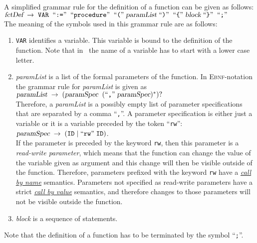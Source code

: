 \noindent
A simplified grammar rule for the definition of a function can be given as follows:
\\[0.2cm]
\hspace*{1.3cm}
$\textsl{fctDef} \;\rightarrow\; \mathtt{VAR}\; \;\mbox{``\texttt{:=}''}\; \;\mbox{``\texttt{procedure}''}\; \;\mbox{``\texttt{(}''}\; \textsl{paramList} 
 \;\mbox{``\texttt{)}''}\; \;\mbox{``\texttt{\{}''}\; \textsl{block} \;\mbox{``\texttt{\}}''}\; \;\mbox{``\texttt{;}''}\;$
\\[0.2cm]
The meaning of the symbols used in this grammar rule are as follows:
\begin{enumerate}
\item \texttt{VAR} identifies a variable.  This variable is bound to the definition of the function.
      Note that in \setlx\ the name of a variable has to start with a lower case letter.
\item \textsl{paramList} is a list of the formal parameters of the function.  In
      \textsc{Ebnf}-notation the grammar rule for \textsl{paramList} is given as
      \\[0.2cm]
      \hspace*{1.3cm}
      $\textsl{paramList} \;\rightarrow\; (\textsl{paramSpec}\;\; (\mbox{``\texttt{,}''}\; \textsl{paramSpec})^*)?$
      \\[0.2cm]
      Therefore, a \textsl{paramList} is a possibly empty list of parameter specifications that are 
      separated by a comma ``\texttt{,}''.  A parameter specification is either just a variable
      or it is a variable preceded by the token ``\texttt{rw}'':
      \\[0.2cm]
      \hspace*{1.3cm}
      $\textsl{paramSpec} \;\rightarrow\; (\mathtt{ID} \mid \mbox{``\texttt{rw}''}\; \mathtt{ID})$.
      \\[0.2cm]  
      If the parameter is preceded by the keyword \texttt{rw}, then this parameter is a 
      \emph{read-write parameter}, which means that the function can change the value of the
      variable given as argument and this change will then be visible
      outside of the function.  Therefore, parameters prefixed with
      the keyword \texttt{rw} have a 
      \href{http://en.wikipedia.org/wiki/Call_by_name#Call_by_name}{\emph{call by name}}
      semantics.  Parameters not specified as read-write parameters have a strict
      \href{http://en.wikipedia.org/wiki/Call_by_value#Call_by_value}{\emph{call by value}} 
      semantics, and therefore changes to those parameters will not be
      visible outside the function.
\item \textsl{block} is a sequence of statements.
\end{enumerate}
Note that the definition of a function has to be terminated by the symbol ``\texttt{;}''.

